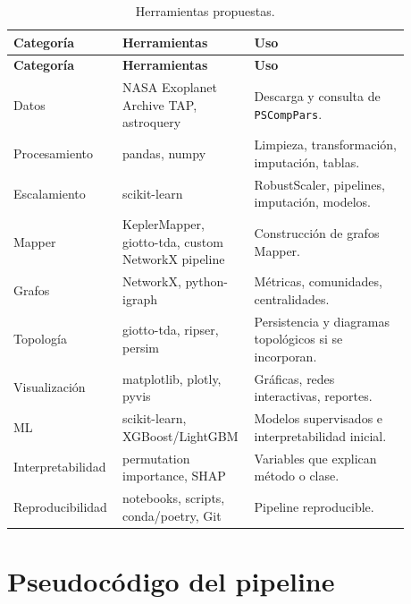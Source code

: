 \documentclass[11pt,letterpaper]{article}
\begin{document}
\begin{longtable}{p{0.22\linewidth}p{0.28\linewidth}p{0.38\linewidth}}
\caption{Herramientas propuestas.}\\
\toprule
\textbf{Categoría} & \textbf{Herramientas} & \textbf{Uso} \\
\midrule
\endfirsthead
\toprule
\textbf{Categoría} & \textbf{Herramientas} & \textbf{Uso} \\
\midrule
\endhead
Datos & NASA Exoplanet Archive TAP, astroquery & Descarga y consulta de \texttt{PSCompPars}. \\
Procesamiento & pandas, numpy & Limpieza, transformación, imputación, tablas. \\
Escalamiento & scikit-learn & RobustScaler, pipelines, imputación, modelos. \\
Mapper & KeplerMapper, giotto-tda, custom NetworkX pipeline & Construcción de grafos Mapper. \\
Grafos & NetworkX, python-igraph & Métricas, comunidades, centralidades. \\
Topología & giotto-tda, ripser, persim & Persistencia y diagramas topológicos si se incorporan. \\
Visualización & matplotlib, plotly, pyvis & Gráficas, redes interactivas, reportes. \\
ML & scikit-learn, XGBoost/LightGBM & Modelos supervisados e interpretabilidad inicial. \\
Interpretabilidad & permutation importance, SHAP & Variables que explican método o clase. \\
Reproducibilidad & notebooks, scripts, conda/poetry, Git & Pipeline reproducible. \\
\bottomrule
\end{longtable}

\section{Pseudocódigo del pipeline}
\end{document}
